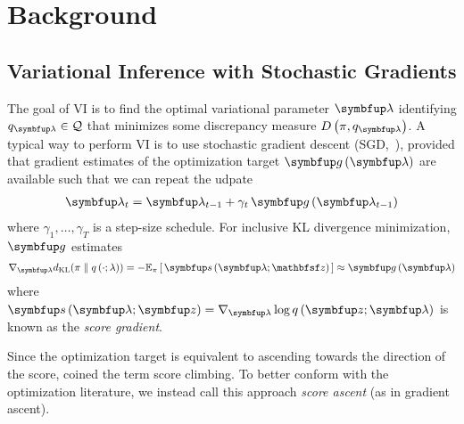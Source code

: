 
\vspace{-0.1in}
\section{Background}
\subsection{Variational Inference with Stochastic Gradients}\label{section:ivi_previous}
The goal of VI is to find the optimal variational parameter \(\vlambda\) identifying \(q_{\vlambda} \in \mathcal{Q}\) that minimizes some discrepancy measure \(D\left(\pi, q_{\vlambda}\right)\).
A typical way to perform VI is to use stochastic gradient descent (SGD,~\citealt{robbins_stochastic_1951}), provided that gradient estimates of the optimization target \(\vg\,(\vlambda)\) are available such that we can repeat the udpate
{%
\begin{align*}
  \vlambda_{t} = \vlambda_{t-1} + \gamma_{t} \, \vg\left(\vlambda_{t-1}\right)
\end{align*}
}%
where \(\gamma_1, \ldots, \gamma_T\) is a step-size schedule.
For inclusive KL divergence minimization, \(\vg\) estimates
%
{%
\begin{align*}
  \nabla_{\vlambda} \DKL{\pi}{q\left(\cdot; \lambda\right)}
  = -\Esub{\pi}{ \vs\,(\vlambda; \rvvz) } 
  \approx \vg\left(\vlambda\right)
\end{align*}
}%
%
where \(\vs\,(\vlambda;\vz) = \nabla_{\vlambda} \log q\,(\vz; \vlambda)\) is known as the \textit{score gradient}.

Since the optimization target is equivalent to ascending towards the direction of the score, \citet{NEURIPS2020_b2070693} coined the term score climbing.
To better conform with the optimization literature, we instead call this approach \textit{score ascent} (as in gradient ascent).

